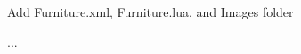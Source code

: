 
\begin{DoxyItemize}
\item Add Furniture.\+xml, Furniture.\+lua, and Images folder
\item ... 
\end{DoxyItemize}